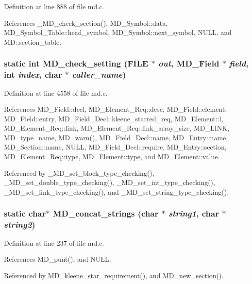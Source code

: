 Definition at line 888 of file md.c.

References \_\-MD\_\-check\_\-section(), MD\_\-Symbol::data, MD\_\-Symbol\_\-Table::head\_\-symbol, MD\_\-Symbol::next\_\-symbol, NULL, and MD::section\_\-table.
\subsubsection{\setlength{\rightskip}{0pt plus 5cm}static int MD\_\-check\_\-setting (FILE $\ast$ {\em out}, \bf{MD\_\-Field} $\ast$ {\em field}, int {\em index}, char $\ast$ {\em caller\_\-name})\hspace{0.3cm}{\tt  [static]}}\label{md_8c_1ce33f624def659236eaba03e1a84005}




Definition at line 4558 of file md.c.

References MD\_\-Field::decl, MD\_\-Element\_\-Req::desc, MD\_\-Field::element, MD\_\-Field::entry, MD\_\-Field\_\-Decl::kleene\_\-starred\_\-req, MD\_\-Element::l, MD\_\-Element\_\-Req::link, MD\_\-Element\_\-Req::link\_\-array\_\-size, MD\_\-LINK, MD\_\-type\_\-name, MD\_\-warn(), MD\_\-Field\_\-Decl::name, MD\_\-Entry::name, MD\_\-Section::name, NULL, MD\_\-Field\_\-Decl::require, MD\_\-Entry::section, MD\_\-Element\_\-Req::type, MD\_\-Element::type, and MD\_\-Element::value.

Referenced by \_\-MD\_\-set\_\-block\_\-type\_\-checking(), \_\-MD\_\-set\_\-double\_\-type\_\-checking(), \_\-MD\_\-set\_\-int\_\-type\_\-checking(), \_\-MD\_\-set\_\-link\_\-type\_\-checking(), and \_\-MD\_\-set\_\-string\_\-type\_\-checking().
\subsubsection{\setlength{\rightskip}{0pt plus 5cm}static char$\ast$ MD\_\-concat\_\-strings (char $\ast$ {\em string1}, char $\ast$ {\em string2})\hspace{0.3cm}{\tt  [static]}}\label{md_8c_c56dbedaf694e6cfcbefeef8187c2fd7}




Definition at line 237 of file md.c.

References MD\_\-punt(), and NULL.

Referenced by MD\_\-kleene\_\-star\_\-requirement(), and MD\_\-new\_\-section().

